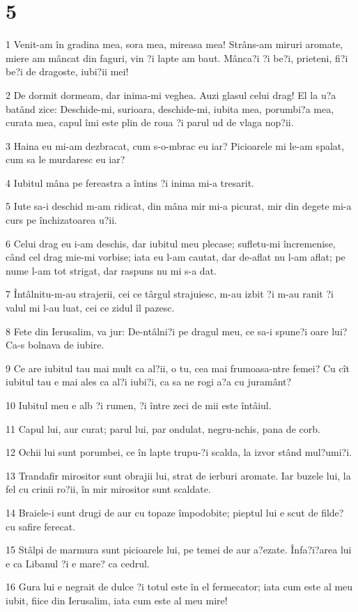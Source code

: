 \chapter{5}

\par 1 Venit-am în gradina mea, sora mea, mireasa mea! Strâns-am miruri aromate, miere am mâncat din faguri, vin ?i lapte am baut. Mânca?i ?i be?i, prieteni, fi?i be?i de dragoste, iubi?ii mei!
\par 2 De dormit dormeam, dar inima-mi veghea. Auzi glasul celui drag! El la u?a batând zice: Deschide-mi, surioara, deschide-mi, iubita mea, porumbi?a mea, curata mea, capul îmi este plin de roua ?i parul ud de vlaga nop?ii.
\par 3 Haina eu mi-am dezbracat, cum s-o-mbrac eu iar? Picioarele mi le-am spalat, cum sa le murdaresc eu iar?
\par 4 Iubitul mâna pe fereastra a întins ?i inima mi-a tresarit.
\par 5 Iute sa-i deschid m-am ridicat, din mâna mir mi-a picurat, mir din degete mi-a curs pe închizatoarea u?ii.
\par 6 Celui drag eu i-am deschis, dar iubitul meu plecase; sufletu-mi încremenise, când cel drag mie-mi vorbise; iata eu l-am cautat, dar de-aflat nu l-am aflat; pe nume l-am tot strigat, dar raspuns nu mi s-a dat.
\par 7 Întâlnitu-m-au strajerii, cei ce târgul strajuiesc, m-au izbit ?i m-au ranit ?i valul mi l-au luat, cei ce zidul îl pazesc.
\par 8 Fete din Ierusalim, va jur: De-ntâlni?i pe dragul meu, ce sa-i spune?i oare lui? Ca-s bolnava de iubire.
\par 9 Ce are iubitul tau mai mult ca al?ii, o tu, cea mai frumoasa-ntre femei? Cu cît iubitul tau e mai ales ca al?i iubi?i, ca sa ne rogi a?a cu juramânt?
\par 10 Iubitul meu e alb ?i rumen, ?i între zeci de mii este întâiul.
\par 11 Capul lui, aur curat; parul lui, par ondulat, negru-nchis, pana de corb.
\par 12 Ochii lui sunt porumbei, ce în lapte trupu-?i scalda, la izvor stând mul?umi?i.
\par 13 Trandafir mirositor sunt obrajii lui, strat de ierburi aromate. Iar buzele lui, la fel cu crinii ro?ii, în mir mirositor sunt scaldate.
\par 14 Braiele-i sunt drugi de aur cu topaze împodobite; pieptul lui e scut de filde? cu safire ferecat.
\par 15 Stâlpi de marmura sunt picioarele lui, pe temei de aur a?ezate. Înfa?i?area lui e ca Libanul ?i e mare? ca cedrul.
\par 16 Gura lui e negrait de dulce ?i totul este în el fermecator; iata cum este al meu iubit, fiice din Ierusalim, iata cum este al meu mire!


